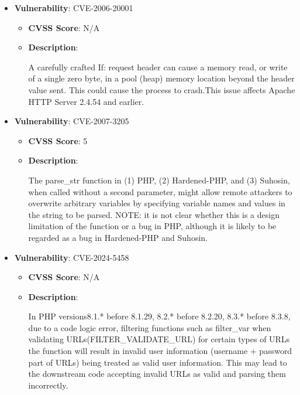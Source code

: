 \documentclass{article}
\begin{document}
\begin{itemize}
        \item \textbf{Vulnerability}: CVE-2006-20001
        \begin{itemize}
            \item \textbf{CVSS Score}:  N/A 
            \item \textbf{Description}:
            \parbox[t]{0.9\linewidth}{
                \ttfamily A carefully crafted If: request header can cause a memory read, or write of a single zero byte, in a pool (heap) memory location beyond the header value sent. This could cause the process to crash.This issue affects Apache HTTP Server 2.4.54 and earlier.
            }
        \end{itemize}
    
        \item \textbf{Vulnerability}: CVE-2007-3205
        \begin{itemize}
            \item \textbf{CVSS Score}:  5 
            \item \textbf{Description}:
            \parbox[t]{0.9\linewidth}{
                \ttfamily The parse\_str function in (1) PHP, (2) Hardened-PHP, and (3) Suhosin, when called without a second parameter, might allow remote attackers to overwrite arbitrary variables by specifying variable names and values in the string to be parsed.  NOTE: it is not clear whether this is a design limitation of the function or a bug in PHP, although it is likely to be regarded as a bug in Hardened-PHP and Suhosin.
            }
        \end{itemize}
    
        \item \textbf{Vulnerability}: CVE-2024-5458
        \begin{itemize}
            \item \textbf{CVSS Score}:  N/A 
            \item \textbf{Description}:
            \parbox[t]{0.9\linewidth}{
                \ttfamily In PHP versions8.1.* before 8.1.29, 8.2.* before 8.2.20, 8.3.* before 8.3.8, due to a code logic error, filtering functions such as filter\_var when validating URLs(FILTER\_VALIDATE\_URL) for certain types of URLs the function will result in invalid user information (username + password part of URLs) being treated as valid user information. This may lead to the downstream code accepting invalid URLs as valid and parsing them incorrectly.
            }
        \end{itemize}
    

\end{itemize}
\end{document}
